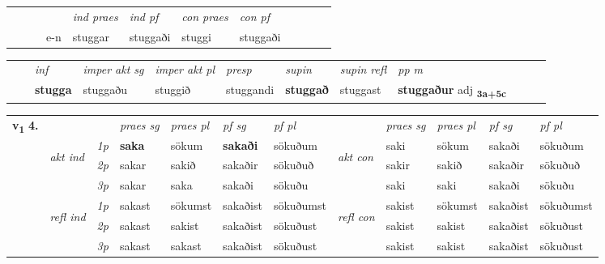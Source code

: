 \begin{tabular}{llllllllllll}
 & &  & &  \textit{ind praes} & \textit{ind pf} & \textit{con praes} & \textit{con pf} \\*
&  & & e-n & stuggar & stuggaði & stuggi & stuggaði \\*
\cmidrule{5-9}
\end{tabular}


\begin{tabular}{llllllllllll}
 & & \textit{inf} & \textit{imper akt sg} & \textit{imper akt pl}   & \textit{presp} & \textit{supin} & \textit{supin refl} & \textit{pp m}     \\*
  & & \textbf{stugga} & stuggaðu  & stuggið   & stuggandi &  \textbf{stuggað} & stuggast & \textbf{stuggaður} adj \textbf{\textsubscript{3a+5c}} \\*
\cmidrule{1-12}
\end{tabular}



\begin{tabular}{llllllllllll} \toprule
\multirow{4}{*}{{{\textbf{v{\textsubscript{1}}} \Large{\textbf{4.}}}}}  & &   &  \textit{praes sg}  & \textit{praes pl}  &\textit{ pf sg} & \textit{pf pl} &  &  \textit{praes sg}  & \textit{praes pl}  & \textit{pf sg} & \textit{pf pl } \\*
	\cmidrule{4-7} \cmidrule{9-12}
 & \multirow{3}{*}{\begin{turn}{90}\textit{akt ind}\end{turn}} & {\textit{1p}} & \textbf{saka} & sökum    & \textbf{sakaði} & sökuðum & \multirow{3}{*}{\begin{turn}{90}\textit{akt con}\end{turn}} &saki & sökum & sakaði & sökuðum\\*
& &  {\textit{2p}} &  sakar  & sakið   & sakaðir & sökuðuð & & sakir & sakið & sakaðir & sökuðuð \\*
& &  {\textit{3p}} & sakar & saka   & sakaði & sökuðu & & saki & saki& sakaði & sökuðu  \\*
\cmidrule{4-7} \cmidrule{9-12}
 &\multirow{3}{*}{\begin{turn}{90}\textit{refl ind}\end{turn}} & {\textit{1p}} & sakast & sökumst    & sakaðist & sökuðumst & \multirow{3}{*}{\begin{turn}{90}\textit{refl con}\end{turn}}  &sakist & sökumst & sakaðist & sökuðumst\\*
 &&  {\textit{2p}} &  sakast  & sakist   & sakaðist & sökuðust & &sakist & sakist & sakaðist & sökuðust \\*
& &  {\textit{3p}} & sakast & sakast   & sakaðist & sökuðust & & sakist & sakist& sakaðist & sökuðust  \\*
\cmidrule{4-7} \cmidrule{9-12}
\end{tabular}


